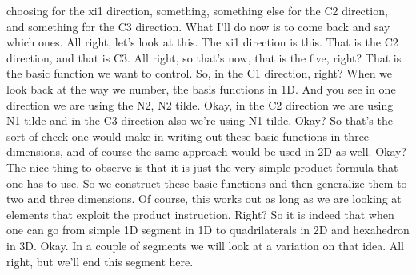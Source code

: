 \documentclass[10pt]{article}
\begin{document}
choosing for the xi1 direction, something, something else for the C2 direction, and something for the C3 direction. What I'll do now is to come back and say which ones. All right, let's look at this. The xi1 direction is this. That is the C2 direction, and that is C3. All right, so that's now, that is the five, right? That is the basic function we want to control. So, in the C1 direction, right? When we look back at the way we number, the basis functions in 1D. And you see in one direction we are using the N2, N2 tilde. Okay, in the C2 direction we are using N1 tilde and in the C3 direction also we're using N1 tilde. Okay? So that's the sort of check one would make in writing out these basic functions in three dimensions, and of course the same approach would be used in 2D as well. Okay? The nice thing to observe is that it is just the very simple product formula that one has to use. So we construct these basic functions and then generalize them to two and three dimensions. Of course, this works out as long as we are looking at elements that exploit the product instruction. Right? So it is indeed that when one can go from simple 1D segment in 1D to quadrilaterals in 2D and hexahedron in 3D. Okay. In a couple of segments we will look at a variation on that idea. All right, but we'll end this segment here.
\end{document}
